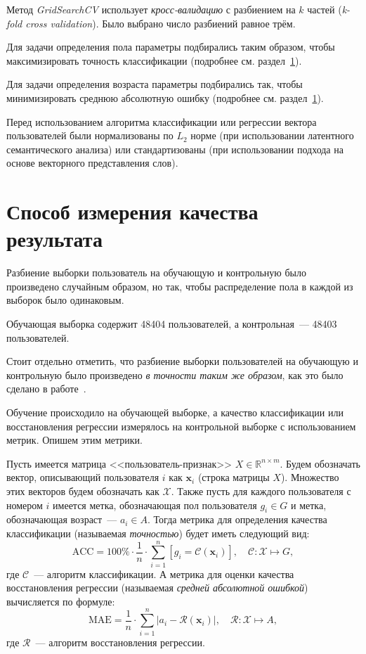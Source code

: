 Метод \textit{GridSearchCV} использует \textit{кросс-валидацию}
с разбиением на $k$ частей (\textit{k-fold cross validation}).
Было выбрано число разбиений равное трём.

Для задачи определения пола параметры подбирались таким
образом, чтобы максимизировать точность классификации (подробнее
см. раздел~\ref{sec:result_quality}).

Для задачи определения возраста параметры подбирались так, чтобы
минимизировать среднюю абсолютную ошибку (подробнее см.
раздел~\ref{sec:result_quality}).

Перед использованием алгоритма классификации или регрессии
вектора пользователей были нормализованы по $L_2$ норме
(при использовании латентного семантического анализа) или
стандартизованы (при использовании подхода на основе
векторного представления слов).

\section{Способ измерения качества результата}
\label{sec:result_quality}

Разбиение выборки пользователь на обучающую и контрольную
было произведено случайным образом, но так, чтобы распределение
пола в каждой из выборок было одинаковым.

Обучающая выборка содержит 48404 пользователей, а контрольная~---
48403 пользователей.

Стоит отдельно отметить, что разбиение выборки пользователей на
обучающую и контрольную было произведено \textit{в точности таким
же образом}, как это было сделано в работе~\cite{wu2014gender}.

Обучение происходило на обучающей выборке, а качество классификации
или восстановления регрессии измерялось на контрольной выборке
с использованием метрик. Опишем этим метрики. 

Пусть имеется матрица <<пользователь-признак>>
$X \in \mathbb{R}^{n \times m}$. Будем обозначать вектор,
описывающий пользователя $i$ как $\bm{x}_i$ (строка матрицы $X$).
Множество этих векторов будем обозначать как $\mathcal{X}$.
Также пусть для каждого пользователя с номером $i$ имеется метка,
обозначающая пол пользователя $g_i \in G$ и метка, обозначающая
возраст~--- $a_i \in A$. Тогда метрика для определения качества
классификации (называемая \textit{точностью}) будет иметь следующий вид:
\[
    \mathrm{ACC} = 
    100\% \cdot \frac{1}{n} \cdot 
    \sum_{i=1}^{n}[g_i = \mathcal{C}(\bm{x}_i)],
    \quad \mathcal{C} \colon \mathcal{X} \mapsto G,
\]
где $\mathcal{C}$~--- алгоритм классификации. А метрика для оценки
качества восстановления регрессии (называемая \textit{средней
абсолютной ошибкой}) вычисляется по формуле:
\[
    \mathrm{MAE} =
    \frac{1}{n} \cdot \sum_{i=1}^{n} 
    \left|a_i - \mathcal{R}(\bm{x}_i)\right|,
    \quad \mathcal{R} \colon \mathcal{X} \mapsto A,
\]
где $\mathcal{R}$~--- алгоритм восстановления регрессии.

